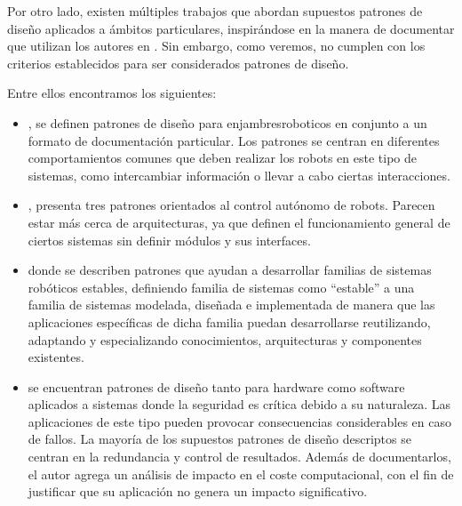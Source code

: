 Por otro lado, existen múltiples trabajos que abordan supuestos patrones de diseño aplicados a ámbitos particulares, inspirándose en la manera de documentar que utilizan los autores en \cite{Gamma:1995:DPE:186897}. Sin embargo, como veremos, no cumplen con los criterios establecidos para ser considerados patrones de diseño.

Entre ellos encontramos los siguientes:

\begin{itemize}
\item \cite{enjambre}, se definen patrones de diseño para \gls{enjambresroboticos} en conjunto a un formato de documentación particular. Los patrones se centran en diferentes comportamientos comunes que deben realizar los robots en este tipo de sistemas, como intercambiar información o llevar a cabo ciertas interacciones.

\item \cite{patterns_2013}, presenta tres patrones orientados al control autónomo de robots. Parecen estar más cerca de arquitecturas, ya que definen el funcionamiento general de ciertos sistemas sin definir módulos y sus interfaces.

\item \cite{stable} donde se describen patrones que ayudan a desarrollar familias de sistemas robóticos estables, definiendo familia de sistemas como ``estable'' a una familia de sistemas modelada, diseñada e implementada de manera que las aplicaciones específicas de dicha familia puedan desarrollarse reutilizando, adaptando y especializando conocimientos, arquitecturas y componentes existentes.

\item \cite{critical} se encuentran patrones de diseño tanto para hardware como software aplicados a sistemas donde la seguridad es crítica debido a su naturaleza. Las aplicaciones de este tipo pueden provocar consecuencias considerables en caso de fallos. La mayoría de los supuestos patrones de diseño descriptos se centran en la redundancia y control de resultados. Además de documentarlos, el autor agrega un análisis de impacto en el coste computacional, con el fin de justificar que su aplicación no genera un impacto significativo.

\end{itemize}

